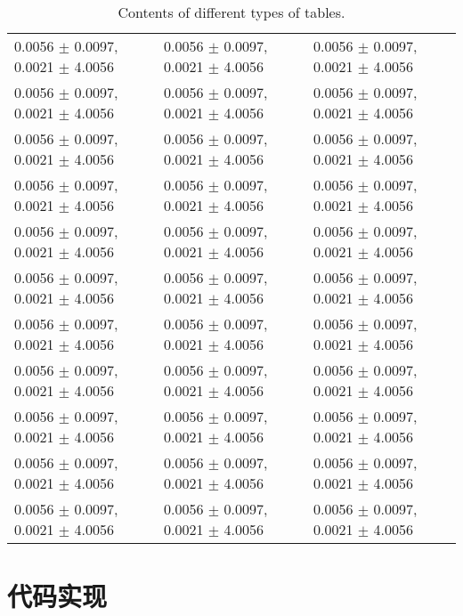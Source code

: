 \documentclass{libs/ccnu_format}
\begin{document}
\begin{frame}{}
\begin{minipage}{0.55\linewidth}
\begin{table}[H]
{\begin{tabular}{lll}
    0.0056 $\pm$ 0.0097, 0.0021 $\pm$ 4.0056 & 0.0056 $\pm$ 0.0097, 0.0021 $\pm$ 4.0056 &  0.0056 $\pm$ 0.0097, 0.0021 $\pm$ 4.0056\\
    0.0056 $\pm$ 0.0097, 0.0021 $\pm$ 4.0056 & 0.0056 $\pm$ 0.0097, 0.0021 $\pm$ 4.0056 &  0.0056 $\pm$ 0.0097, 0.0021 $\pm$ 4.0056\\
    0.0056 $\pm$ 0.0097, 0.0021 $\pm$ 4.0056& 0.0056 $\pm$ 0.0097, 0.0021 $\pm$ 4.0056 &  0.0056 $\pm$ 0.0097, 0.0021 $\pm$ 4.0056\\
    0.0056 $\pm$ 0.0097, 0.0021 $\pm$ 4.0056& 0.0056 $\pm$ 0.0097, 0.0021 $\pm$ 4.0056 &  0.0056 $\pm$ 0.0097, 0.0021 $\pm$ 4.0056\\
    0.0056 $\pm$ 0.0097, 0.0021 $\pm$ 4.0056& 0.0056 $\pm$ 0.0097, 0.0021 $\pm$ 4.0056 &  0.0056 $\pm$ 0.0097, 0.0021 $\pm$ 4.0056\\
\midrule
0.0056 $\pm$ 0.0097, 0.0021 $\pm$ 4.0056 & 0.0056 $\pm$ 0.0097, 0.0021 $\pm$ 4.0056 &  0.0056 $\pm$ 0.0097, 0.0021 $\pm$ 4.0056\\
    0.0056 $\pm$ 0.0097, 0.0021 $\pm$ 4.0056 & 0.0056 $\pm$ 0.0097, 0.0021 $\pm$ 4.0056 &  0.0056 $\pm$ 0.0097, 0.0021 $\pm$ 4.0056\\
    0.0056 $\pm$ 0.0097, 0.0021 $\pm$ 4.0056 & 0.0056 $\pm$ 0.0097, 0.0021 $\pm$ 4.0056 &  0.0056 $\pm$ 0.0097, 0.0021 $\pm$ 4.0056\\
    0.0056 $\pm$ 0.0097, 0.0021 $\pm$ 4.0056& 0.0056 $\pm$ 0.0097, 0.0021 $\pm$ 4.0056 &  0.0056 $\pm$ 0.0097, 0.0021 $\pm$ 4.0056\\
    0.0056 $\pm$ 0.0097, 0.0021 $\pm$ 4.0056& 0.0056 $\pm$ 0.0097, 0.0021 $\pm$ 4.0056 &  0.0056 $\pm$ 0.0097, 0.0021 $\pm$ 4.0056\\
    0.0056 $\pm$ 0.0097, 0.0021 $\pm$ 4.0056& 0.0056 $\pm$ 0.0097, 0.0021 $\pm$ 4.0056 &  0.0056 $\pm$ 0.0097, 0.0021 $\pm$ 4.0056\\
\bottomrule
  \end{tabular}
  }
  \caption{\footnotesize Contents of different types of tables.}
\end{table}
\end{minipage}
\end{frame}

\section{代码实现}
\end{document}
